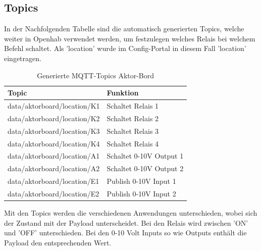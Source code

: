 \subsection{Topics}
In der Nachfolgenden Tabelle sind die automatisch generierten Topics, welche weiter in Openhab verwendet werden, um festzulegen welches Relais bei welchem Befehl schaltet. Als 'location' wurde im Config-Portal in diesem Fall 'location' eingetragen.
\begin{table}[H]
	\centering
	\begin{tabular}{|l|l|}
		\hline 
		 Topic  & Funktion  \\ 
		\hline 
		data/aktorboard/location/K1 & Schaltet Relais 1  \\ 
		\hline
		data/aktorboard/location/K2 & Schaltet Relais 2  \\ 
		\hline
		data/aktorboard/location/K3 & Schaltet Relais 3  \\ 
		\hline
		data/aktorboard/location/K4 & Schaltet Relais 4  \\ 
		\hline 
		data/aktorboard/location/A1 & Schaltet 0-10V Output 1  \\ 
		\hline
		data/aktorboard/location/A2 & Schaltet 0-10V Output 2  \\ 
		\hline
		data/aktorboard/location/E1 & Publish 0-10V Input 1  \\ 
		\hline
		data/aktorboard/location/E2 & Publish 0-10V Input 2  \\ 
		\hline
	\end{tabular} 	
\caption{Generierte MQTT-Topics Aktor-Bord}
\label{tab: MQTT-Topics Aktor}
\end{table}
 
Mit den Topics werden die verschiedenen Anwendungen unterschieden, wobei sich der Zustand mit der Payload unterscheidet. Bei den Relais wird zwischen 'ON' und 'OFF' unterschieden. Bei den 0-10 Volt Inputs so wie Outputs enthält die Payload den entsprechenden Wert. 
